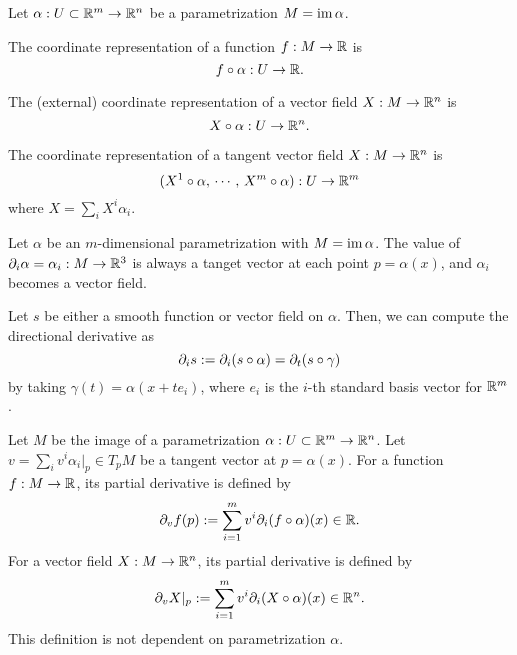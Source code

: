 \documentclass{../note}
\def\a{\alpha}
\begin{document}
\begin{prb}
Let $\a:U\subset\R^m\to\R^n$ be a parametrization $M=\im\a$.
\begin{parts}
\item The coordinate representation of a function $f:M\to\mathbb{R}$ is
\[f\circ\a:U\to\R.\]
\item The (external) coordinate representation of a vector field $X:M\to\mathbb{R}^n$ is
\[X\circ\a:U\to\R^n.\]
\item The coordinate representation of a tangent vector field $X:M\to\mathbb{R}^n$ is
\[(X^1\circ\a,\,\cdots,\,X^m\circ\a):U\to\R^m\]
where $X=\sum_iX^i\a_i$.
\end{parts}
\end{prb}

\begin{prb}
Let $\a$ be an $m$-dimensional parametrization with $M=\im\a$.
The value of $\pd_i\a=\a_i:M\to\R^3$ is always a tanget vector at each point $p=\a(x)$, and $\a_i$ becomes a vector field.

Let $s$ be either a smooth function or vector field on $\a$.
Then, we can compute the directional derivative as
\[\pd_is:=\pd_i(s\circ\a)=\pd_t(s\circ\gamma)\]
by taking $\gamma(t)=\a(x+te_i)$, where $e_i$ is the $i$-th standard basis vector for $\mathbb{R}^m$.
\end{prb}

\begin{prb}
Let $M$ be the image of a parametrization $\a:U\subset\R^m\to\R^n$.
Let $v=\sum_iv^i\a_i|_p\in T_pM$ be a tangent vector at $p=\a(x)$.
For a function $f:M\to\mathbb{R}$, its partial derivative is defined by
\[\pd_vf(p):=\sum_{i=1}^mv^i\pd_i(f\circ\a)(x)\in\R.\]
For a vector field $X:M\to\mathbb{R}^n$, its partial derivative is defined by
\[\pd_vX|_p:=\sum_{i=1}^mv^i\pd_i(X\circ\a)(x)\in\R^n.\]
This definition is not dependent on parametrization $\a$.
\end{prb}
\end{document}
